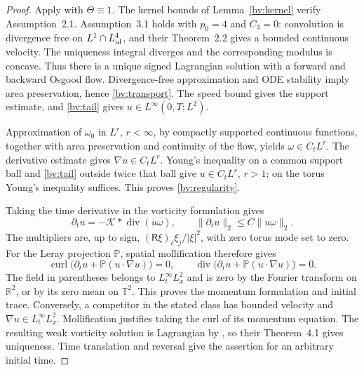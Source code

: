 \documentclass[11pt]{amsart}
\theoremstyle{remark}
\numberwithin{equation}{section}
\newcommand{\R}{\mathbb R}
\newcommand{\T}{\mathbb T}
\begin{document}
\begin{proof}
Apply \cite[Theorems~3.3 and~4.1]{CrippaStefani2024} with
$\Theta\equiv1$. The kernel bounds of Lemma~\ref{bv:kernel}
verify Assumption~2.1. Assumption~3.1 holds with $p_0=4$ and
$C_3=0$: convolution is divergence free on
$L^1\cap L^4_{\rm ul}$, and their Theorem~2.2 gives a bounded
continuous velocity. The uniqueness integral diverges and the
corresponding modulus is concave. Thus there is a unique signed
Lagrangian solution with a forward and backward Osgood flow.
Divergence-free approximation and ODE stability imply area
preservation, hence \eqref{bv:transport}. The speed bound gives
the support estimate, and \eqref{bv:tail} gives
$u\in L^\infty(0,T;L^2)$.

Approximation of $\omega_0$ in $L^r$, $r<\infty$, by compactly
supported continuous functions, together with area preservation
and continuity of the flow, yields $\omega\in C_tL^r$.
The derivative estimate gives $\nabla u\in C_tL^r$.
Young's inequality on a common support ball and \eqref{bv:tail}
outside twice that ball give $u\in C_tL^r$, $r>1$; on the torus
Young's inequality suffices. This proves \eqref{bv:regularity}.

Taking the time derivative in the vorticity formulation gives
\begin{equation}\label{bv:timemultiplier}
 \partial_tu=-\mathcal K*\operatorname{div}(u\omega),\qquad
 \|\partial_tu\|_2\le C\|u\omega\|_2.
\end{equation}
The multipliers are, up to sign,
$(\mathsf R\xi)_\ell\xi_j/|\xi|^2$, with zero torus mode set to
zero. For the Leray projection $\mathbb P$, spatial mollification
therefore gives
\[
 \operatorname{curl}\bigl(\partial_tu+\mathbb P(u\cdot\nabla u)\bigr)=0,
 \qquad
 \operatorname{div}\bigl(\partial_tu+\mathbb P(u\cdot\nabla u)\bigr)=0.
\]
The field in parentheses belongs to $L^\infty_tL^2_x$ and is
zero by the Fourier transform on $\R^2$, or by its zero mean on
$\T^2$. This proves the momentum formulation and initial trace.
Conversely, a competitor in the stated class has bounded velocity
and $\nabla u\in L^\infty_tL^2_x$. Mollification justifies taking
the curl of its momentum equation. The resulting weak vorticity
solution is Lagrangian by \cite[Remark~1.7]{CrippaStefani2024},
so their Theorem~4.1 gives uniqueness. Time translation and reversal
give the assertion for an arbitrary initial time.
\end{proof}
\end{document}
